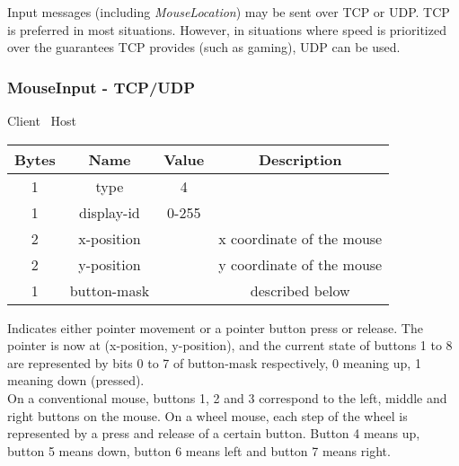 \documentclass{article}
\begin{document}
    Input messages (including \emph{MouseLocation}) may be sent over TCP or UDP. TCP is preferred in most situations.
    However, in situations where speed is prioritized over the guarantees TCP provides (such as gaming), UDP can be
    used.

    \subsubsection{MouseInput - TCP/UDP}

    \begin{center}
        Client \textrightarrow\ Host\\
        \begin{tabular}{|c|c|c|c|}
            \hline
            \textbf{Bytes} & \textbf{Name} & \textbf{Value} & \textbf{Description}      \\
            \hline
            1              & type          & 4              &                           \\
            \hline
            1              & display-id    & 0-255          &                           \\
            \hline
            2              & x-position    &                & x coordinate of the mouse \\
            \hline
            2              & y-position    &                & y coordinate of the mouse \\
            \hline
            1              & button-mask   &                & described below           \\
            \hline
        \end{tabular}
    \end{center}

    Indicates either pointer movement or a pointer button press or release. The pointer is now at (x-position,
    y-position), and the current state of buttons 1 to 8 are represented by bits 0 to 7 of button-mask respectively,
    0 meaning up, 1 meaning down (pressed).\\

    On a conventional mouse, buttons 1, 2 and 3 correspond to the left, middle and right buttons on the mouse. On a
    wheel mouse, each step of the wheel is represented by a press and release of a certain button. Button 4 means up,
    button 5 means down, button 6 means left and button 7 means right.
\end{document}
